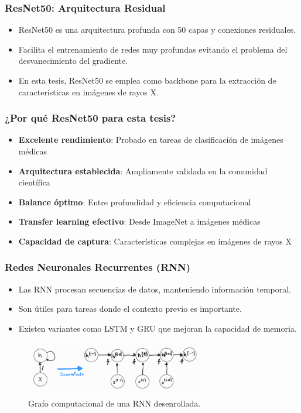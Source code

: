\begin{frame}
\frametitle{ResNet50: Arquitectura Residual}
\begin{itemize}
    \item ResNet50 es una arquitectura profunda con 50 capas y conexiones residuales.
    \item Facilita el entrenamiento de redes muy profundas evitando el problema del desvanecimiento del gradiente.
    \item En esta tesis, ResNet50 se emplea como backbone para la extracción de características en imágenes de rayos X.
\end{itemize}
\end{frame}

\begin{frame}
\frametitle{¿Por qué ResNet50 para esta tesis?}
\begin{itemize}
    \item \textbf{Excelente rendimiento}: Probado en tareas de clasificación de imágenes médicas
    \item \textbf{Arquitectura establecida}: Ampliamente validada en la comunidad científica
    \item \textbf{Balance óptimo}: Entre profundidad y eficiencia computacional
    \item \textbf{Transfer learning efectivo}: Desde ImageNet a imágenes médicas
    \item \textbf{Capacidad de captura}: Características complejas en imágenes de rayos X
\end{itemize}
\end{frame}

\begin{frame}
\frametitle{Redes Neuronales Recurrentes (RNN)}
\begin{itemize}
    \item Las RNN procesan secuencias de datos, manteniendo información temporal.
    \item Son útiles para tareas donde el contexto previo es importante.
    \item Existen variantes como LSTM y GRU que mejoran la capacidad de memoria.
\end{itemize}
\begin{figure}[ht!]
    \centering
    \includegraphics[width=0.7\textwidth]{../Chapters/2. Transformer/Figures/rnn/rnn_cgraph.png}
    \caption{Grafo computacional de una RNN desenrollada.}
\end{figure}
\end{frame}

